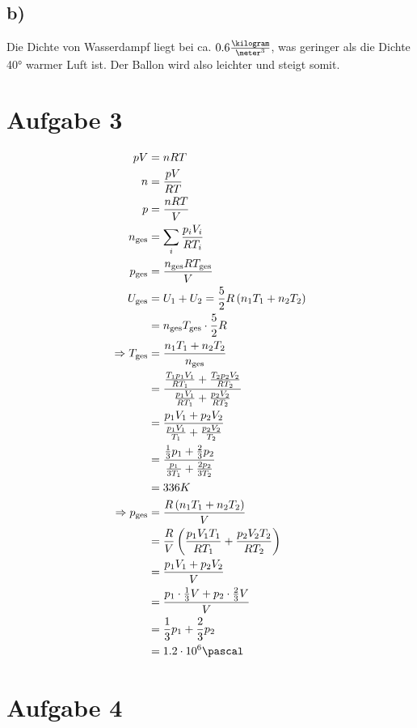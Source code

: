 \documentclass[12pt,a4paper,notitlepage]{article}
\newcommand{\aufgabe}[1]{\section*{\setcounter{section}{#1}Aufgabe #1}}
\begin{document}
\subsection*{b)}
Die Dichte von Wasserdampf liegt bei ca. $0.6\frac{\kilogram}{\meter^3}$, was geringer als die Dichte 40° warmer Luft ist. Der Ballon wird also leichter und steigt somit.
\aufgabe{3}
\begin{align}
pV&=nRT\\
n&=\frac{pV}{RT}\\
p&=\frac{nRT}{V}\\
n_\text{ges}&=\sum_i\frac{p_iV_i}{RT_i}\\
p_\text{ges}&=\frac{n_\text{ges}RT_\text{ges}}{V}\\
U_\text{ges}&=U_1+U_2=\frac{5}{2}R\left(n_1T_1+n_2T_2\right)\\
&=n_\text{ges}T_\text{ges}\cdot\frac{5}{2}R\\
\Rightarrow T_\text{ges}&=\frac{n_1T_1+n_2T_2}{n_\text{ges}}\\
&=\frac{\frac{T_1p_1V_1}{RT_1}+\frac{T_2p_2V_2}{RT_2}}{\frac{p_1V_1}{RT_1}+\frac{p_2V_2}{RT_2}}\\
&=\frac{p_1V_1+p_2V_2}{\frac{p_1V_1}{T_1}+\frac{p_2V_2}{T_2}}\\
&=\frac{\frac{1}{3}p_1+\frac{2}{3}p_2}{\frac{p_1}{3T_1}+\frac{2p_2}{3T_2}}\\
&=336K\\
\Rightarrow p_\text{ges}&=\frac{R\left(n_1T_1+n_2T_2\right)}{V}\\
&=\frac{R}{V}\left(\frac{p_1V_1T_1}{RT_1}+\frac{p_2V_2T_2}{RT_2}\right)\\
&=\frac{p_1V_1+p_2V_2}{V}\\
&=\frac{p_1\cdot\frac{1}{3}V+p_2\cdot\frac{2}{3}V}{V}\\
&=\frac{1}{3}p_1+\frac{2}{3}p_2\\
&=1.2\cdot 10^6\pascal
\end{align}
\aufgabe{4}
\end{document}

